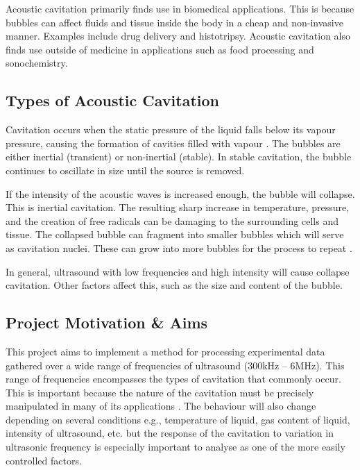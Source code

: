 \documentclass[reprint,NumberedRefs]{JASA}
\begin{document}
Acoustic cavitation primarily finds use in biomedical applications. This is because bubbles can affect fluids and tissue inside the body in a cheap and non-invasive manner. Examples include drug delivery and histotripsy. Acoustic cavitation also finds use outside of medicine in applications such as food processing and sonochemistry.

\subsection{Types of Acoustic Cavitation}

Cavitation occurs when the static pressure of the liquid falls below its vapour pressure, causing the formation of cavities filled with vapour \cite{Leighton1994}. The bubbles are either inertial (transient) or non-inertial (stable). In stable cavitation, the bubble continues to oscillate in size until the source is removed.

If the intensity of the acoustic waves is increased enough, the bubble will collapse. This is inertial cavitation. The resulting sharp increase in temperature, pressure, and the creation of free radicals can be damaging to the surrounding cells and tissue. The collapsed bubble can fragment into smaller bubbles which will serve as cavitation nuclei. These can grow into more bubbles for the process to repeat \cite{pitt2004ultrasonic}.

In general, ultrasound with low frequencies and high intensity will cause collapse cavitation. Other factors affect this, such as the size and content of the bubble.

\subsection{Project Motivation \& Aims}

This project aims to implement a method for processing experimental data gathered over a wide range of frequencies of ultrasound (300kHz – 6MHz). This range of frequencies encompasses the types of cavitation that commonly occur. This is important because the nature of the cavitation must be precisely manipulated in many of its applications \cite{pitt2004ultrasonic}. The behaviour will also change depending on several conditions e.g., temperature of liquid, gas content of liquid, intensity of ultrasound, etc. but the response of the cavitation to variation in ultrasonic frequency is especially important to analyse as one of the more easily controlled factors.
\end{document}
